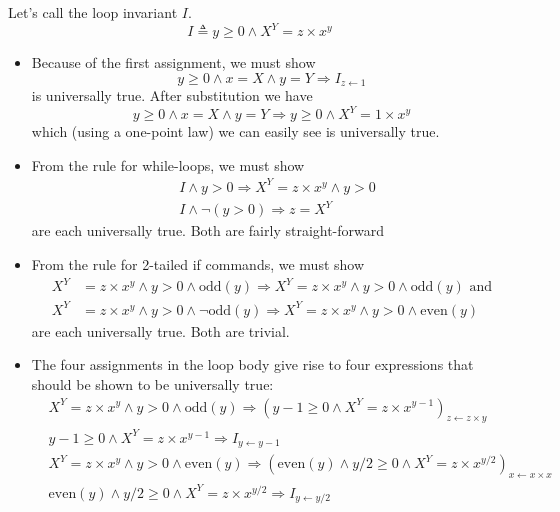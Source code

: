\documentclass[11pt]{article}%
\begin{document}
Let's call the loop invariant $I$.%
\[
I\triangleq y\geq0\wedge X^{Y}=z\times x^{y}%
\]


\begin{itemize}
\item Because of the first assignment, we must show%
\[
y\geq0\wedge x=X\wedge y=Y\Rightarrow I_{z\leftarrow1}%
\]
is universally true. After substitution we have%
\[
y\geq0\wedge x=X\wedge y=Y\Rightarrow y\geq0\wedge X^{Y}=1\times x^{y}%
\]
which (using a one-point law) we can easily see is universally true.

\item From the rule for while-loops, we must show%
\begin{align*}
&  I\wedge y>0\Rightarrow X^{Y}=z\times x^{y}\wedge y>0\\
&  I\wedge\lnot\left(  y>0\right)  \Rightarrow z=X^{Y}%
\end{align*}
are each universally true. Both are fairly straight-forward

\item From the rule for 2-tailed if commands, we must show%
\begin{align*}
X^{Y}  &  =z\times x^{y}\wedge y>0\wedge\mathrm{odd}(y)\Rightarrow
X^{Y}=z\times x^{y}\wedge y>0\wedge\mathrm{odd}(y)\text{ and}\\
X^{Y}  &  =z\times x^{y}\wedge y>0\wedge\lnot\mathrm{odd}(y)\Rightarrow
X^{Y}=z\times x^{y}\wedge y>0\wedge\mathrm{even}(y)
\end{align*}
are each universally true. Both are trivial.

\item The four assignments in the loop body give rise to four expressions that
should be shown to be universally true:%
\begin{align*}
&  \left.  X^{Y}=z\times x^{y}\wedge y>0\wedge\mathrm{odd}(y)\right.
\Rightarrow\left(  y-1\geq0\wedge X^{Y}=z\times x^{y-1}\right)  _{z\leftarrow
z\times y}\\
&  \left.  y-1\geq0\wedge X^{Y}=z\times x^{y-1}\right.  \Rightarrow
I_{y\leftarrow y-1}\\
&  \left.  X^{Y}=z\times x^{y}\wedge y>0\wedge\mathrm{even}(y)\right.
\Rightarrow\left(  \mathrm{even}(y)\wedge y/2\geq0\wedge X^{Y}=z\times
x^{y/2}\right)  _{x\leftarrow x\times x}\\
&  \left.  \mathrm{even}(y)\wedge y/2\geq0\wedge X^{Y}=z\times x^{y/2}\right.
\Rightarrow I_{y\leftarrow y/2}%
\end{align*}

\end{itemize}
\end{document}
